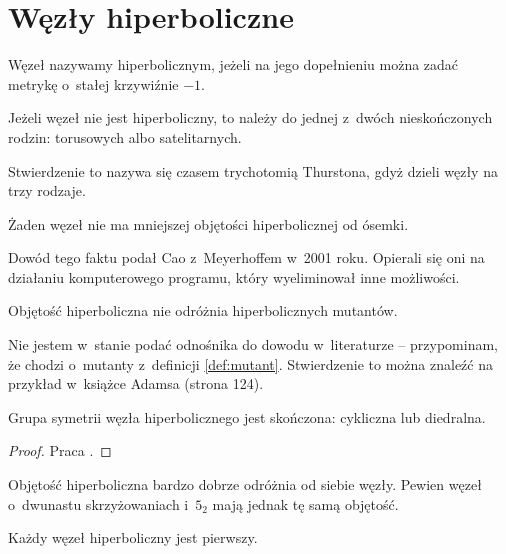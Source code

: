 \section{Węzły hiperboliczne} %
\label{sec:hyperbolic}
\begin{definition}
    Węzeł nazywamy hiperbolicznym, jeżeli na jego dopełnieniu można zadać metrykę o~stałej krzywiźnie $-1$.
\end{definition}

\begin{theorem}[Thurston, 1978]
    Jeżeli węzeł nie jest hiperboliczny, to należy do jednej z~dwóch nieskończonych rodzin: torusowych albo satelitarnych.
\end{theorem}

Stwierdzenie to nazywa się czasem trychotomią Thurstona, gdyż dzieli węzły na trzy rodzaje.

\begin{proposition}
    Żaden węzeł nie ma mniejszej objętości hiperbolicznej od ósemki.
\end{proposition}

Dowód tego faktu podał Cao z~Meyerhoffem w~2001 roku.
Opierali się oni na działaniu komputerowego programu, który wyeliminował inne możliwości.

\begin{proposition}
    Objętość hiperboliczna nie odróżnia hiperbolicznych mutantów.
\end{proposition}

Nie jestem w~stanie podać odnośnika do dowodu w~literaturze -- przypominam, że chodzi o~mutanty z~definicji \ref{def:mutant}.
Stwierdzenie to można znaleźć na przykład w~książce Adamsa (strona 124).

\begin{proposition}
    Grupa symetrii węzła hiperbolicznego jest skończona: cykliczna lub diedralna.
\end{proposition}

\begin{proof}
    Praca \cite{kodama92}.
\end{proof}

Objętość hiperboliczna bardzo dobrze odróżnia od siebie węzły.
Pewien węzeł o~dwunastu skrzyżowaniach i~$5_2$ mają jednak tę samą objętość.

\begin{proposition}
    Każdy węzeł hiperboliczny jest pierwszy.
\end{proposition}

